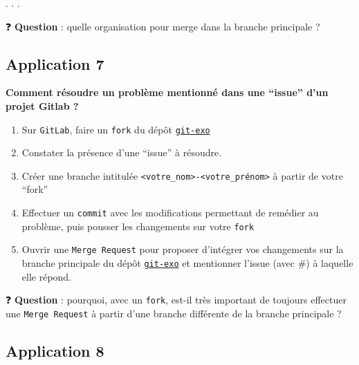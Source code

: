 \documentclass[
  letterpaper,
  DIV=11,
  numbers=noendperiod]{scrartcl}
\providecommand{\tightlist}{%
  \setlength{\itemsep}{0pt}\setlength{\parskip}{0pt}}\usepackage{longtable,booktabs,array}
\begin{document}
. . .

❓ \textbf{Question} : quelle organisation pour merge dans la branche
principale ?

\hypertarget{application-7}{%
\subsection{Application 7}\label{application-7}}

\begin{tcolorbox}[enhanced jigsaw, colframe=quarto-callout-tip-color-frame, rightrule=.15mm, breakable, colbacktitle=quarto-callout-tip-color!10!white, coltitle=black, toptitle=1mm, title={Contribution à un projet open-source}, titlerule=0mm, leftrule=.75mm, colback=white, bottomrule=.15mm, bottomtitle=1mm, toprule=.15mm, opacitybacktitle=0.6, arc=.35mm, left=2mm, opacityback=0]

\textbf{Comment résoudre un problème mentionné dans une ``issue'' d'un
projet Gitlab ?}

\begin{enumerate}
\def\labelenumi{\arabic{enumi}.}
\tightlist
\item
  Sur \texttt{GitLab}, faire un \texttt{fork} du dépôt
  \href{https://gitlab.intranet.social.gouv.fr/leomoquay/projet_collaboratif_formation}{\texttt{git-exo}}
\item
  Constater la présence d'une ``issue'' à résoudre.
\item
  Créer une branche intitulée
  \texttt{\textless{}votre\_nom\textgreater{}-\textless{}votre\_prénom\textgreater{}}
  à partir de votre ``fork''
\item
  Effectuer un \texttt{commit} avec les modifications permettant de
  remédier au problème, puis pousser les changements sur votre
  \texttt{fork}
\item
  Ouvrir une \texttt{Merge\ Request} pour proposer d'intégrer vos
  changements sur la branche principale du dépôt
  \href{https://github.com/avouacr/git-exo.git}{\texttt{git-exo}} et
  mentionner l'issue (avec \#) à laquelle elle répond.
\end{enumerate}

\end{tcolorbox}

❓ \textbf{Question} : pourquoi, avec un \texttt{fork}, est-il très
important de toujours effectuer une \texttt{Merge\ Request} à partir
d'une branche différente de la branche principale ?

\hypertarget{application-8}{%
\subsection{Application 8}\label{application-8}}
\end{document}
